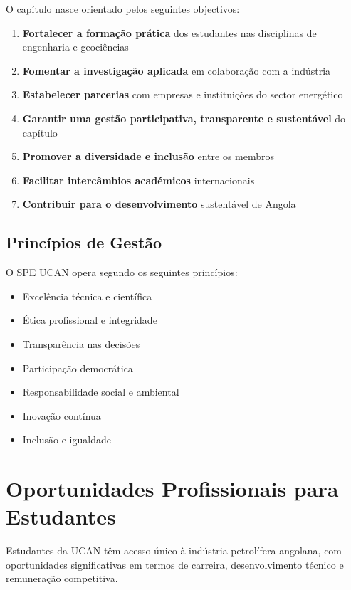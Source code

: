 \documentclass[12pt]{article}
\begin{document}
O capítulo nasce orientado pelos seguintes objectivos:

\begin{enumerate}
    \item \textbf{Fortalecer a formação prática} dos estudantes nas disciplinas de engenharia e geociências
    \item \textbf{Fomentar a investigação aplicada} em colaboração com a indústria
    \item \textbf{Estabelecer parcerias} com empresas e instituições do sector energético
    \item \textbf{Garantir uma gestão participativa, transparente e sustentável} do capítulo
    \item \textbf{Promover a diversidade e inclusão} entre os membros
    \item \textbf{Facilitar intercâmbios académicos} internacionais
    \item \textbf{Contribuir para o desenvolvimento} sustentável de Angola
\end{enumerate}

\subsection{Princípios de Gestão}

O SPE UCAN opera segundo os seguintes princípios:

\begin{itemize}
    \item Excelência técnica e científica
    \item Ética profissional e integridade
    \item Transparência nas decisões
    \item Participação democrática
    \item Responsabilidade social e ambiental
    \item Inovação contínua
    \item Inclusão e igualdade
\end{itemize}

\newpage

\section{Oportunidades Profissionais para Estudantes}

Estudantes da UCAN têm acesso único à indústria petrolífera angolana, com oportunidades significativas em termos de carreira, desenvolvimento técnico e remuneração competitiva.
\end{document}
